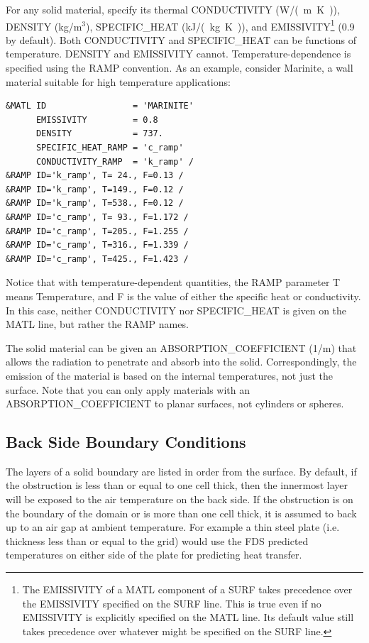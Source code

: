 \documentclass[11pt]{book}
\begin{document}
For any solid material, specify its thermal {\ct CONDUCTIVITY} (\si{W/(m.K)}), {\ct DENSITY} (kg/m$^3$), {\ct SPECIFIC\_HEAT} (\si{kJ/(kg.K)}), and {\ct EMISSIVITY}\footnote{The {\ct EMISSIVITY} of a {\ct MATL} component of a {\ct SURF} takes precedence over the {\ct EMISSIVITY} specified on the {\ct SURF} line. This is true even if no {\ct EMISSIVITY} is explicitly specified on the {\ct MATL} line. Its default value still takes precedence over whatever might be specified on the {\ct SURF} line.} (0.9 by default). Both {\ct CONDUCTIVITY} and {\ct SPECIFIC\_HEAT} can be functions of temperature. {\ct DENSITY} and {\ct EMISSIVITY} cannot. Temperature-dependence is specified using the {\ct RAMP} convention. As an example, consider Marinite, a wall material suitable for high temperature applications:
\begin{lstlisting}
&MATL ID                 = 'MARINITE'
      EMISSIVITY         = 0.8
      DENSITY            = 737.
      SPECIFIC_HEAT_RAMP = 'c_ramp'
      CONDUCTIVITY_RAMP  = 'k_ramp' /
&RAMP ID='k_ramp', T= 24., F=0.13 /
&RAMP ID='k_ramp', T=149., F=0.12 /
&RAMP ID='k_ramp', T=538., F=0.12 /
&RAMP ID='c_ramp', T= 93., F=1.172 /
&RAMP ID='c_ramp', T=205., F=1.255 /
&RAMP ID='c_ramp', T=316., F=1.339 /
&RAMP ID='c_ramp', T=425., F=1.423 /
\end{lstlisting}
Notice that with temperature-dependent quantities, the {\ct RAMP} parameter {\ct T} means Temperature, and {\ct F} is the value of either the specific heat or conductivity. In this case, neither {\ct CONDUCTIVITY} nor {\ct SPECIFIC\_HEAT} is given on the {\ct MATL} line, but rather the {\ct RAMP} names.

The solid material can be given an {\ct ABSORPTION\_COEFFICIENT} (1/m) that allows the radiation to penetrate and absorb into the solid. Correspondingly, the emission of the material is based on the internal temperatures, not just the surface. Note that you can only apply materials with an {\ct ABSORPTION\_COEFFICIENT} to planar surfaces, not cylinders or spheres.




\subsection{Back Side Boundary Conditions}
\label{info:BACKING}

The layers of a solid boundary are listed in order from the surface. By default, if the obstruction is less than or equal to one cell thick, then the innermost layer will be exposed to the air temperature on the back side.  If the obstruction is on the boundary of the domain or is more than one cell thick, it is assumed to back up to an air gap at ambient temperature. For example a thin steel plate (i.e. thickness less than or equal to the grid) would use the FDS predicted temperatures on either side of the plate for predicting heat transfer.
\end{document}
